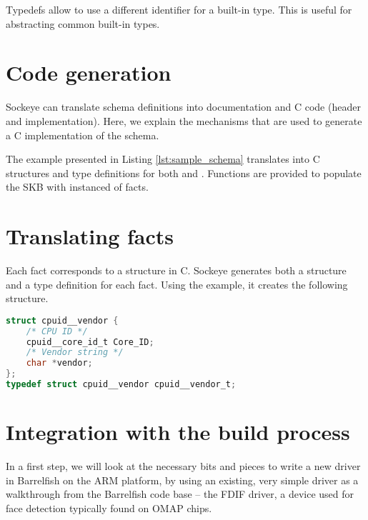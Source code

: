 \documentclass[a4paper,11pt,twoside]{report}
\begin{document}
Typedefs allow to use a different identifier for a built-in type. This is useful
for abstracting common built-in types.


\section{Code generation}

Sockeye can translate schema definitions into documentation and C code (header
and implementation). Here, we explain the mechanisms that are used to generate a
C implementation of the schema.

The example presented in Listing \ref{lst:sample_schema} translates into C
structures and type definitions for both  and
. Functions are provided to populate the SKB with instanced of
facts.

\section{Translating facts}

Each fact corresponds to a structure in C. Sockeye generates both a structure
and a type definition for each fact. Using the example, it creates the following
structure.

\begin{lstlisting}[caption={C header for fact
\varname{vendor}},label={lst:c_vendor},language=C]
struct cpuid__vendor {
    /* CPU ID */
    cpuid__core_id_t Core_ID;
    /* Vendor string */
    char *vendor;
};
typedef struct cpuid__vendor cpuid__vendor_t;
\end{lstlisting}



\section{Integration with the build process}



In a first step, we will look at the necessary bits and pieces to write a new
driver in Barrelfish on the ARM platform, by using an existing, very simple
driver as a walkthrough from the Barrelfish code base -- the FDIF driver, a
device used for face detection typically found on OMAP chips.
\end{document}
